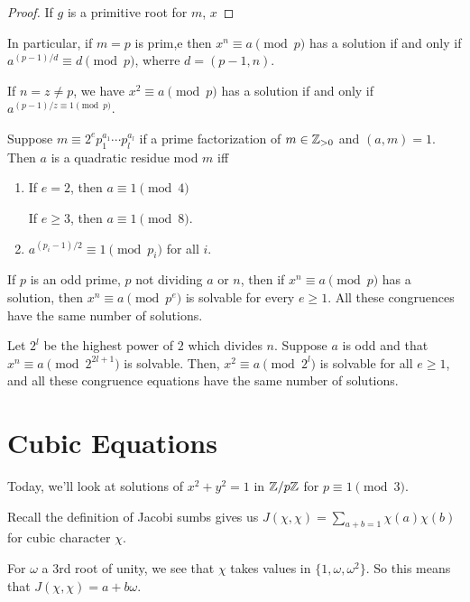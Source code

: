 \documentclass{article}
\begin{document}
\begin{proof}
    If $g$ is a primitive root for $m$, $x $
\end{proof}

In particular, if $m = p$ is prim,e then $x^n \equiv a \pmod p$ has a solution if and only if $a^{(p-1)/d} \equiv d \pmod p$, wherre $d = (p-1, n)$.

If $n = z \neq p$, we have $x^2 \equiv a \pmod p$ has a solution if and only if $a^{(p-1)/z \equiv 1 \pmod p}$.

\begin{lemma}
    Suppose $m \equiv 2^e p_1^{a_1} \cdots p_l^{a_l}$ if a prime factorization of $m \in \mathbb Z_{> 0}$ and $(a, m) = 1$. Then $a$ is a quadratic residue mod $m$ iff 
    \begin{enumerate}[label=(\alph*)]
        \item If $e = 2$, then $a \equiv 1 \pmod 4$

        If $e \geq 3$, then $a \equiv 1 \pmod 8$.
        \item $a^{(p_i - 1)/2} \equiv 1 \pmod{p_i}$ for all $i$.
    \end{enumerate}
\end{lemma}

\begin{lemma}
    If $p$ is an odd prime, $p$ not dividing $a$ or $n$, then if $x^n \equiv a \pmod p$ has a solution, then $x^n \equiv a \pmod{p^e}$ is solvable for every $e \geq 1$. All these congruences have the same number of solutions.
\end{lemma}

\begin{lemma}
    Let $2^l$ be the highest power of $2$ which divides $n$. Suppose $a$ is odd and that $x^n \equiv a \pmod{2^{2l + 1}}$ is solvable. Then, $x^2 \equiv a \pmod{2^l}$ is solvable for all $e \geq 1$, and all these congruence equations have the same number of solutions.
\end{lemma}

\section{Cubic Equations}
Today, we'll look at solutions of $x^2 + y^2 = 1$ in $\mathbb Z / p\mathbb Z$ for $p \equiv 1 \pmod 3$.

Recall the definition of Jacobi sumbs gives us $J(\chi, \chi) = \sum_{a + b = 1} \chi(a) \chi(b)$ for cubic character $\chi$.

For $\omega$ a 3rd root of unity, we see that $\chi$ takes values in $\{1, \omega, \omega^2\}$. So this means that $J(\chi, \chi) = a + b\omega$.
\end{document}
